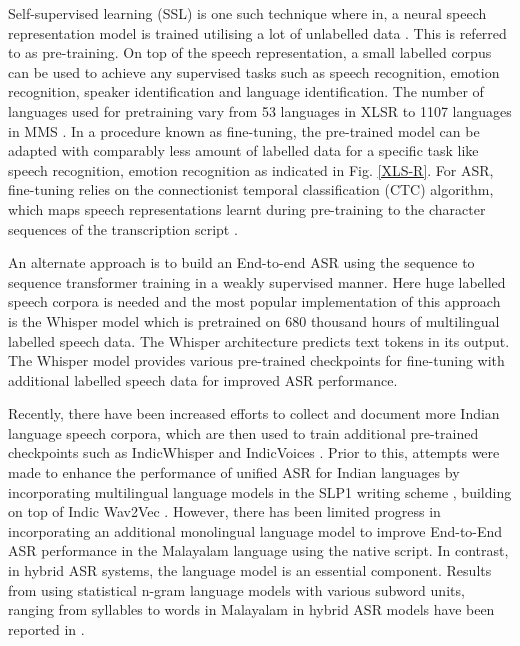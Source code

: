 \documentclass[runningheads]{llncs}
\begin{document}
Self-supervised learning (SSL) is one such technique where in, a neural speech representation model is trained utilising a lot of unlabelled data  \cite{schneider2019wav2vec,baevski2020wav2vec,conneau2020unsupervised,barrault2023seamlessm4t}. This is referred to as pre-training. On top of the speech representation, a small labelled corpus can be used to achieve any supervised tasks such as speech recognition, emotion recognition, speaker identification and language identification. The number of languages used for pretraining vary from 53 languages in XLSR to 1107 languages in MMS \cite{pratap2024scaling}. In a procedure known as fine-tuning, the pre-trained model can be adapted with comparably less amount of labelled data for a specific task like speech recognition, emotion recognition as indicated in Fig. \ref{XLS-R}. For ASR, fine-tuning relies on the connectionist temporal classification (CTC) algorithm, which maps speech representations learnt during pre-training to the character sequences of the transcription script \cite{georgescu2021performance}.

An alternate approach is to build an End-to-end ASR using the sequence to sequence transformer training in a weakly supervised manner. Here huge labelled speech corpora is needed and the most popular implementation of this approach is the Whisper model which is pretrained on 680 thousand hours of multilingual labelled speech data\cite{whisper}. The Whisper architecture predicts  text tokens in its output. The Whisper model provides various pre-trained checkpoints for fine-tuning with additional labelled speech data for improved ASR performance.

Recently, there have been increased efforts to collect and document more Indian language speech corpora, which are then used to train additional pre-trained checkpoints such as IndicWhisper \cite{bhogale2023vistaar} and IndicVoices \cite{javed2024indicvoices}. Prior to this, attempts were made to enhance the performance of unified ASR for Indian languages by incorporating multilingual language models in the SLP1 writing scheme \cite{anoop2022}, building on top of Indic Wav2Vec \cite{javed2022towards}. However, there has been limited progress in incorporating an additional monolingual language model to improve End-to-End ASR performance in the Malayalam language using the native script. In contrast, in hybrid ASR systems, the language model is an essential component. Results from using statistical n-gram language models with various subword units, ranging from syllables to words in Malayalam in hybrid ASR models have been reported in \cite{manohar2023improving}.
\end{document}

